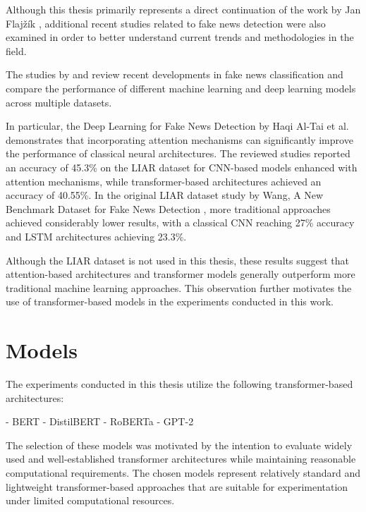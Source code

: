 \begin{markdown}

Although this thesis primarily represents a direct continuation of the work by Jan Flajžík \cite{flajzik_classification_2024}, additional recent studies related to fake news detection were also examined in order to better understand current trends and methodologies in the field.

The studies by \cite{haqi_al-tai_deep_2023} and \cite{swathi_enhancing_2024} review recent developments in fake news classification and compare the performance of different machine learning and deep learning models across multiple datasets.

In particular, the Deep Learning for Fake News Detection by Haqi Al-Tai et al.\cite{haqi_al-tai_deep_2023} demonstrates that incorporating attention mechanisms can significantly improve the performance of classical neural architectures. The reviewed studies reported an accuracy of 45.3\% on the LIAR dataset for CNN-based models enhanced with attention mechanisms, while transformer-based architectures achieved an accuracy of 40.55\%. In the original LIAR dataset study by Wang, A New Benchmark Dataset for Fake News Detection \cite{wang_liar_2017}, more traditional approaches achieved considerably lower results, with a classical CNN reaching 27\% accuracy and LSTM architectures achieving 23.3\%.

Although the LIAR dataset is not used in this thesis, these results suggest that attention-based architectures and transformer models generally outperform more traditional machine learning approaches. This observation further motivates the use of transformer-based models in the experiments conducted in this work.

\end{markdown}

\section{Models}

\begin{markdown}

The experiments conducted in this thesis utilize the following transformer-based architectures:

- BERT
- DistilBERT
- RoBERTa
- GPT-2

The selection of these models was motivated by the intention to evaluate widely used and well-established transformer architectures while maintaining reasonable computational requirements. The chosen models represent relatively standard and lightweight transformer-based approaches that are suitable for experimentation under limited computational resources.

\end{markdown}

